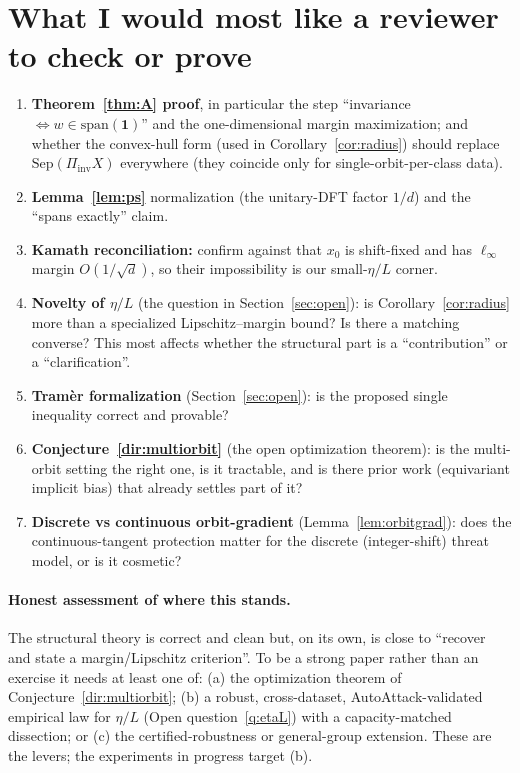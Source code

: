 \documentclass[11pt]{article}
\theoremstyle{plain}
\theoremstyle{definition}
\theoremstyle{remark}
\newcommand{\Sep}{\mathrm{Sep}}
\newcommand{\one}{\mathbf 1}
\newcommand{\Piinv}{\Pi_{\mathrm{inv}}}
\begin{document}
\section{What I would most like a reviewer to check or prove}\label{sec:requests}
\begin{enumerate}[leftmargin=1.4em,topsep=2pt,itemsep=2pt]
\item \textbf{Theorem~\ref{thm:A} proof}, in particular the step ``invariance $\Leftrightarrow w\in\mathrm{span}(\one)$'' and the one-dimensional margin maximization; and whether the convex-hull form (used in Corollary~\ref{cor:radius}) should replace $\Sep(\Piinv X)$ everywhere (they coincide only for single-orbit-per-class data).
\item \textbf{Lemma~\ref{lem:ps}} normalization (the unitary-DFT factor $1/d$) and the ``spans exactly'' claim.
\item \textbf{Kamath reconciliation:} confirm against \citet{kamath2021canwehaveitall} that $x_0$ is shift-fixed and has $\ell_\infty$ margin $O(1/\sqrt d)$, so their impossibility is our small-$\eta/L$ corner.
\item \textbf{Novelty of $\eta/L$} (the question in Section~\ref{sec:open}): is Corollary~\ref{cor:radius} more than a specialized Lipschitz--margin bound? Is there a matching converse? This most affects whether the structural part is a ``contribution'' or a ``clarification''.
\item \textbf{Tramèr formalization} (Section~\ref{sec:open}): is the proposed single inequality correct and provable?
\item \textbf{Conjecture~\ref{dir:multiorbit}} (the open optimization theorem): is the multi-orbit setting the right one, is it tractable, and is there prior work (equivariant implicit bias) that already settles part of it?
\item \textbf{Discrete vs continuous orbit-gradient} (Lemma~\ref{lem:orbitgrad}): does the continuous-tangent protection matter for the discrete (integer-shift) threat model, or is it cosmetic?
\end{enumerate}

\paragraph{Honest assessment of where this stands.} The structural theory is correct and clean but, on its own, is close to ``recover \citet{ge2021shift} and state a margin/Lipschitz criterion''. To be a strong paper rather than an exercise it needs at least one of: (a) the optimization theorem of Conjecture~\ref{dir:multiorbit}; (b) a robust, cross-dataset, AutoAttack-validated empirical law for $\eta/L$ (Open question~\ref{q:etaL}) with a capacity-matched dissection; or (c) the certified-robustness or general-group extension. These are the levers; the experiments in progress target (b).



\end{document}
